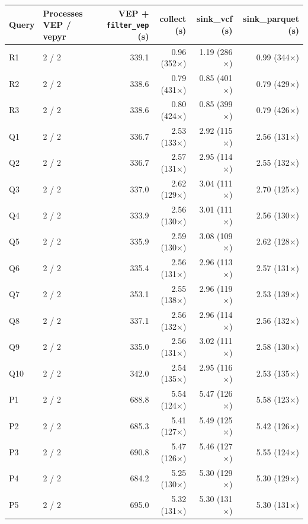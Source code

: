 \begin{tabular}{llrrrr}
\toprule
Query & Processes VEP / vepyr & VEP + \texttt{filter\_vep} (s) & collect (s) & sink\_vcf (s) & sink\_parquet (s) \\
\midrule
R1 & 2 / 2 & 339.1 & 0.96 (352$\times$) & 1.19 (286$\times$) & 0.99 (344$\times$) \\
R2 & 2 / 2 & 338.6 & 0.79 (431$\times$) & 0.85 (401$\times$) & 0.79 (429$\times$) \\
R3 & 2 / 2 & 338.6 & 0.80 (424$\times$) & 0.85 (399$\times$) & 0.79 (426$\times$) \\
Q1 & 2 / 2 & 336.7 & 2.53 (133$\times$) & 2.92 (115$\times$) & 2.56 (131$\times$) \\
Q2 & 2 / 2 & 336.7 & 2.57 (131$\times$) & 2.95 (114$\times$) & 2.55 (132$\times$) \\
Q3 & 2 / 2 & 337.0 & 2.62 (129$\times$) & 3.04 (111$\times$) & 2.70 (125$\times$) \\
Q4 & 2 / 2 & 333.9 & 2.56 (130$\times$) & 3.01 (111$\times$) & 2.56 (130$\times$) \\
Q5 & 2 / 2 & 335.9 & 2.59 (130$\times$) & 3.08 (109$\times$) & 2.62 (128$\times$) \\
Q6 & 2 / 2 & 335.4 & 2.56 (131$\times$) & 2.96 (113$\times$) & 2.57 (131$\times$) \\
Q7 & 2 / 2 & 353.1 & 2.55 (138$\times$) & 2.96 (119$\times$) & 2.53 (139$\times$) \\
Q8 & 2 / 2 & 337.1 & 2.56 (132$\times$) & 2.96 (114$\times$) & 2.56 (132$\times$) \\
Q9 & 2 / 2 & 335.0 & 2.56 (131$\times$) & 3.02 (111$\times$) & 2.58 (130$\times$) \\
Q10 & 2 / 2 & 342.0 & 2.54 (135$\times$) & 2.95 (116$\times$) & 2.53 (135$\times$) \\
P1 & 2 / 2 & 688.8 & 5.54 (124$\times$) & 5.47 (126$\times$) & 5.58 (123$\times$) \\
P2 & 2 / 2 & 685.3 & 5.41 (127$\times$) & 5.49 (125$\times$) & 5.42 (126$\times$) \\
P3 & 2 / 2 & 690.8 & 5.47 (126$\times$) & 5.46 (127$\times$) & 5.55 (124$\times$) \\
P4 & 2 / 2 & 684.2 & 5.25 (130$\times$) & 5.30 (129$\times$) & 5.30 (129$\times$) \\
P5 & 2 / 2 & 695.0 & 5.32 (131$\times$) & 5.30 (131$\times$) & 5.30 (131$\times$) \\
\bottomrule
\end{tabular}
